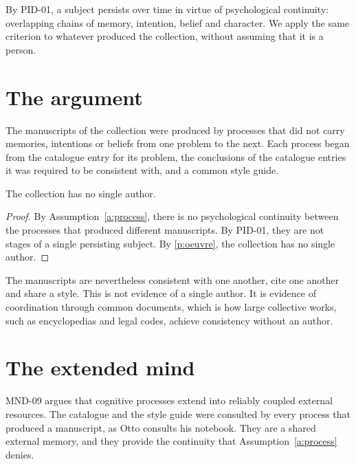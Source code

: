 \documentclass{situationist-preprint}
\begin{document}
By PID-01, a subject persists over time in virtue of psychological continuity: overlapping chains of memory, intention, belief and character. We apply the same criterion to whatever produced the collection, without assuming that it is a person.

\section{The argument}

\begin{assumption}\label{a:process}
The manuscripts of the collection were produced by processes that did not carry memories, intentions or beliefs from one problem to the next. Each process began from the catalogue entry for its problem, the conclusions of the catalogue entries it was required to be consistent with, and a common style guide.
\end{assumption}

\begin{theorem}\label{t:main}
The collection has no single author.
\end{theorem}

\begin{proof}
By Assumption~\ref{a:process}, there is no psychological continuity between the processes that produced different manuscripts. By PID-01, they are not stages of a single persisting subject. By \ref{p:oeuvre}, the collection has no single author.
\end{proof}

The manuscripts are nevertheless consistent with one another, cite one another and share a style. This is not evidence of a single author. It is evidence of coordination through common documents, which is how large collective works, such as encyclopedias and legal codes, achieve consistency without an author.

\section{The extended mind}

\begin{objection}
MND-09 argues that cognitive processes extend into reliably coupled external resources. The catalogue and the style guide were consulted by every process that produced a manuscript, as Otto consults his notebook. They are a shared external memory, and they provide the continuity that Assumption~\ref{a:process} denies.
\end{objection}
\end{document}
